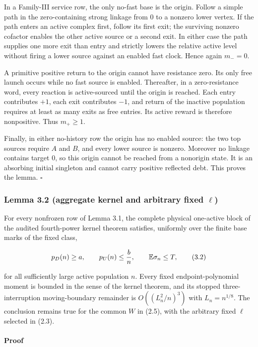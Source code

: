 In a Family-III service row, the only no-fast base is the origin. Follow
a simple path in the zero-containing strong linkage from \(0\) to a
nonzero lower vertex. If the path enters an active complex first, follow
its first exit; the surviving nonzero cofactor enables the other active
source or a second exit. In either case the path supplies one more exit
than entry and strictly lowers the relative active level without firing
a lower source against an enabled fast clock. Hence again \(m_-=0\).

A primitive positive return to the origin cannot have resistance zero.
Its only free launch occurs while no fast source is enabled. Thereafter,
in a zero-resistance word, every reaction is active-sourced until the
origin is reached. Each entry contributes \(+1\), each exit contributes
\(-1\), and return of the inactive population requires at least as many
exits as free entries. Its active reward is therefore nonpositive. Thus
\(m_+\ge1\).

Finally, in either no-history row the origin has no enabled source: the
two top sources require \(A\) and \(B\), and every lower source is
nonzero. Moreover no linkage contains target \(0\), so this origin
cannot be reached from a nonorigin state. It is an absorbing initial
singleton and cannot carry positive reflected debt. This proves the
lemma. \(\square\)

\subsubsection{\texorpdfstring{Lemma 3.2 (aggregate kernel and arbitrary
fixed
\(\ell\))}{Lemma 3.2 (aggregate kernel and arbitrary fixed \textbackslash ell)}}

For every nonfrozen row of Lemma 3.1, the complete physical one-active
block of the audited fourth-power kernel theorem satisfies, uniformly
over the finite base marks of the fixed class,

\[
 p_D(n)\ge a,
 \qquad p_U(n)\le {b\over n},
 \qquad \mathbb E\sigma_n\le T,                     \tag{3.2}
\]

for all sufficiently large active population \(n\). Every fixed
endpoint-polynomial moment is bounded in the sense of the kernel
theorem, and its stopped three-interruption moving-boundary remainder is
\(O((L_n^2/n)^3)\) with \(L_n=n^{1/8}\). The conclusion remains true for
the common \(W\) in (2.5), with the arbitrary fixed \(\ell\) selected in
(2.3).

\paragraph{Proof}

